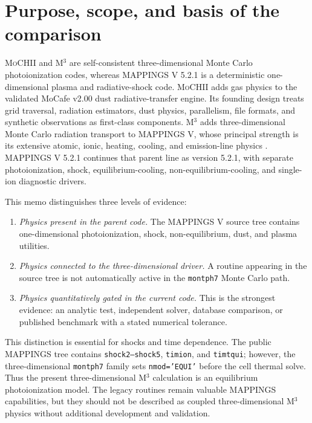 \documentclass[english,a4paper]{my_memo}
\newcommand{\code}[1]{\texttt{#1}}
\newcommand{\MoCHII}{\textsc{MoCHII}}
\newcommand{\Mthree}{M$^3$}
\newcommand{\Mappings}{MAPPINGS V 5.2.1}
\begin{document}
\tableofcontents

\section{Purpose, scope, and basis of the comparison}

\MoCHII{} and \Mthree{} are self-consistent three-dimensional Monte Carlo
photoionization codes, whereas \Mappings{} is a deterministic one-dimensional
plasma and radiative-shock code.  \MoCHII{} adds gas
physics to the validated MoCafe v2.00 dust radiative-transfer engine.  Its
founding design treats grid traversal, radiation estimators, dust physics,
parallelism, file formats, and synthetic observations as first-class
components.  \Mthree{} adds three-dimensional Monte Carlo radiation
transport to MAPPINGS V, whose principal strength is its extensive atomic,
ionic, heating, cooling, and emission-line physics \cite{jin2022,sd1993}.
\Mappings{} continues that parent line as version 5.2.1, with separate
photoionization, shock, equilibrium-cooling, non-equilibrium-cooling, and
single-ion diagnostic drivers.

This memo distinguishes three levels of evidence:

\begin{enumerate}[leftmargin=2em]
\item \emph{Physics present in the parent code.}  The MAPPINGS V source
  tree contains one-dimensional photoionization, shock, non-equilibrium,
  dust, and plasma utilities.
\item \emph{Physics connected to the three-dimensional driver.}  A routine
  appearing in the source tree is not automatically active in the
  \code{montph7} Monte Carlo path.
\item \emph{Physics quantitatively gated in the current code.}  This is the
  strongest evidence: an analytic test, independent solver, database
  comparison, or published benchmark with a stated numerical tolerance.
\end{enumerate}

This distinction is essential for shocks and time dependence.  The public
MAPPINGS tree contains \code{shock2--shock5}, \code{timion}, and
\code{timtqui}; however, the three-dimensional \code{montph7} family sets
\code{nmod='EQUI'} before the cell thermal solve.  Thus the present
three-dimensional \Mthree{} calculation is an equilibrium photoionization
model.  The legacy routines remain valuable MAPPINGS capabilities, but
they should not be described as coupled three-dimensional \Mthree{}
physics without additional development and validation.
\end{document}
